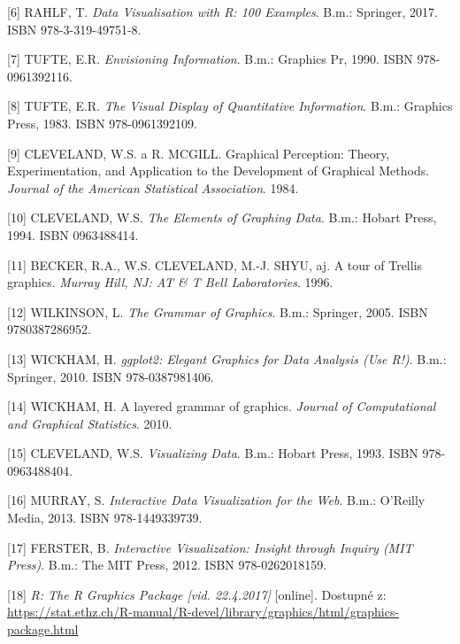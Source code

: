 \documentclass[12pt,]{article}
\begin{document}
\hypertarget{ref-datavis_rahlf}{}
{[}6{]} RAHLF, T. \emph{Data Visualisation with R: 100 Examples}. B.m.:
Springer, 2017. ISBN 978-3-319-49751-8.

\hypertarget{ref-tufte1990}{}
{[}7{]} TUFTE, E.R. \emph{Envisioning Information}. B.m.: Graphics Pr,
1990. ISBN 978-0961392116.

\hypertarget{ref-tufte1983}{}
{[}8{]} TUFTE, E.R. \emph{The Visual Display of Quantitative
Information}. B.m.: Graphics Press, 1983. ISBN 978-0961392109.

\hypertarget{ref-cleveland_mcgill}{}
{[}9{]} CLEVELAND, W.S. a R. MCGILL. Graphical Perception: Theory,
Experimentation, and Application to the Development of Graphical
Methods. \emph{Journal of the American Statistical Association}. 1984.

\hypertarget{ref-cleveland1994}{}
{[}10{]} CLEVELAND, W.S. \emph{The Elements of Graphing Data}. B.m.:
Hobart Press, 1994. ISBN 0963488414.

\hypertarget{ref-trellisplot}{}
{[}11{]} BECKER, R.A., W.S. CLEVELAND, M.-J. SHYU, aj. A tour of Trellis
graphics. \emph{Murray Hill, NJ: AT \& T Bell Laboratories}. 1996.

\hypertarget{ref-wilkinson2005}{}
{[}12{]} WILKINSON, L. \emph{The Grammar of Graphics}. B.m.: Springer,
2005. ISBN 9780387286952.

\hypertarget{ref-wickham_ggplot}{}
{[}13{]} WICKHAM, H. \emph{ggplot2: Elegant Graphics for Data Analysis
(Use R!)}. B.m.: Springer, 2010. ISBN 978-0387981406.

\hypertarget{ref-layered-grammar}{}
{[}14{]} WICKHAM, H. A layered grammar of graphics. \emph{Journal of
Computational and Graphical Statistics}. 2010.

\hypertarget{ref-cleveland1993}{}
{[}15{]} CLEVELAND, W.S. \emph{Visualizing Data}. B.m.: Hobart Press,
1993. ISBN 978-0963488404.

\hypertarget{ref-murray}{}
{[}16{]} MURRAY, S. \emph{Interactive Data Visualization for the Web}.
B.m.: O'Reilly Media, 2013. ISBN 978-1449339739.

\hypertarget{ref-ferster}{}
{[}17{]} FERSTER, B. \emph{Interactive Visualization: Insight through
Inquiry (MIT Press)}. B.m.: The MIT Press, 2012. ISBN 978-0262018159.

\hypertarget{ref-graphics}{}
{[}18{]} \emph{R: The R Graphics Package {[}vid. 22.4.2017{]}}
{[}online{]}. Dostupné z:
\url{https://stat.ethz.ch/R-manual/R-devel/library/graphics/html/graphics-package.html}
\end{document}
